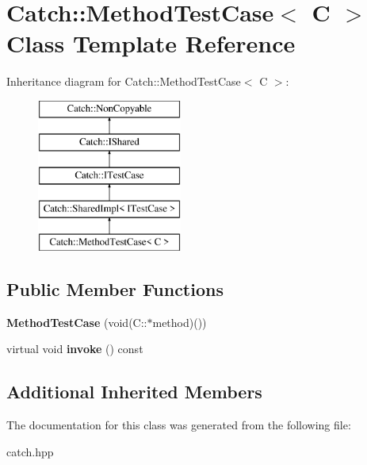 \hypertarget{classCatch_1_1MethodTestCase}{}\section{Catch\+:\+:Method\+Test\+Case$<$ C $>$ Class Template Reference}
\label{classCatch_1_1MethodTestCase}
Inheritance diagram for Catch\+:\+:Method\+Test\+Case$<$ C $>$\+:\begin{figure}[H]
\begin{center}
\leavevmode
\includegraphics[height=5.000000cm]{classCatch_1_1MethodTestCase}
\end{center}
\end{figure}
\subsection*{Public Member Functions}
\begin{DoxyCompactItemize}
\item 
{\bfseries Method\+Test\+Case} (void(C\+::$\ast$method)())\hypertarget{classCatch_1_1MethodTestCase_a7b043b85dae371358255dd9dc6582e7b}{}\label{classCatch_1_1MethodTestCase_a7b043b85dae371358255dd9dc6582e7b}

\item 
virtual void {\bfseries invoke} () const \hypertarget{classCatch_1_1MethodTestCase_a39cc4b760dd71adc3f7550bc1e7eb697}{}\label{classCatch_1_1MethodTestCase_a39cc4b760dd71adc3f7550bc1e7eb697}

\end{DoxyCompactItemize}
\subsection*{Additional Inherited Members}


The documentation for this class was generated from the following file\+:\begin{DoxyCompactItemize}
\item 
catch.\+hpp\end{DoxyCompactItemize}
